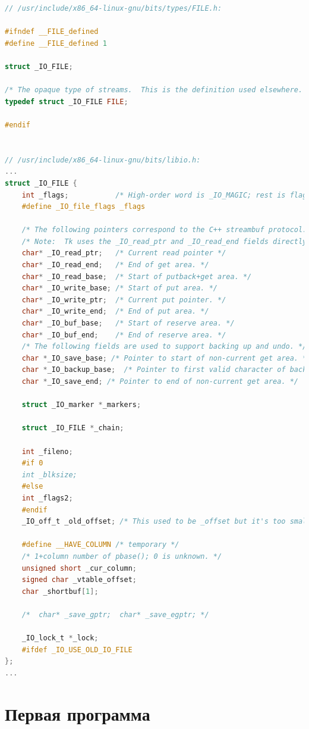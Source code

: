 \documentclass[12pt]{report}
\begin{document}
\begin{lstlisting}[language=c, label=_io_file, caption=Листинг структуры \_IO\_FILE]
// /usr/include/x86_64-linux-gnu/bits/types/FILE.h:

#ifndef __FILE_defined
#define __FILE_defined 1

struct _IO_FILE;

/* The opaque type of streams.  This is the definition used elsewhere.  */
typedef struct _IO_FILE FILE;

#endif


// /usr/include/x86_64-linux-gnu/bits/libio.h:
...
struct _IO_FILE {
	int _flags;           /* High-order word is _IO_MAGIC; rest is flags. */
	#define _IO_file_flags _flags
	
	/* The following pointers correspond to the C++ streambuf protocol. */
	/* Note:  Tk uses the _IO_read_ptr and _IO_read_end fields directly. */
	char* _IO_read_ptr;   /* Current read pointer */
	char* _IO_read_end;   /* End of get area. */
	char* _IO_read_base;  /* Start of putback+get area. */
	char* _IO_write_base; /* Start of put area. */
	char* _IO_write_ptr;  /* Current put pointer. */
	char* _IO_write_end;  /* End of put area. */
	char* _IO_buf_base;   /* Start of reserve area. */
	char* _IO_buf_end;    /* End of reserve area. */
	/* The following fields are used to support backing up and undo. */
	char *_IO_save_base; /* Pointer to start of non-current get area. */
	char *_IO_backup_base;  /* Pointer to first valid character of backup area */
	char *_IO_save_end; /* Pointer to end of non-current get area. */
	
	struct _IO_marker *_markers;
	
	struct _IO_FILE *_chain;
	
	int _fileno;
	#if 0
	int _blksize;
	#else
	int _flags2;
	#endif
	_IO_off_t _old_offset; /* This used to be _offset but it's too small.  */
	
	#define __HAVE_COLUMN /* temporary */
	/* 1+column number of pbase(); 0 is unknown. */
	unsigned short _cur_column;
	signed char _vtable_offset;
	char _shortbuf[1];
	
	/*  char* _save_gptr;  char* _save_egptr; */
	
	_IO_lock_t *_lock;
	#ifdef _IO_USE_OLD_IO_FILE
};
...
\end{lstlisting}
	
\chapter{Первая программа}
\end{document}
